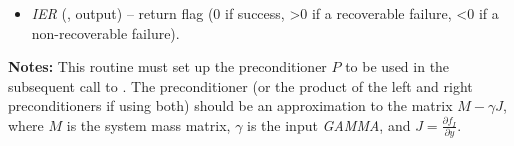 \documentclass[letterpaper,10pt,english]{sphinxmanual}
\begin{document}
\begin{fulllineitems}
\begin{description}
\begin{itemize}
\item {} 
\emph{IER}  (, output) -- return flag  (0 if success, \textgreater{}0 if a recoverable
failure, \textless{}0 if a non-recoverable failure).

\end{itemize}

\end{description}

\textbf{Notes:}
This routine must set up the preconditioner $P$ to be used in
the subsequent call to {\hyperref[f_interface/Usage:f/_/FARKPSOL]{}}.  The preconditioner (or
the product of the left and right preconditioners if using both)
should be an approximation to the matrix  $M - \gamma J$,
where $M$ is the system mass matrix, $\gamma$ is the
input \emph{GAMMA}, and $J = \frac{\partial f_I}{\partial y}$.

\end{fulllineitems}

\end{document}
